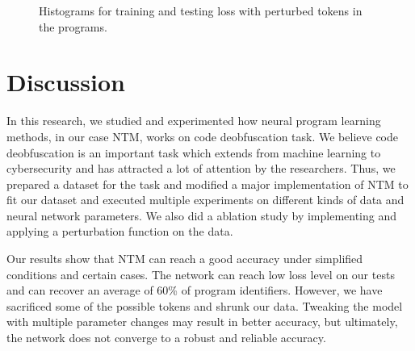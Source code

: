 \documentclass[acmsmall]{acmart}
\begin{document}
\begin{figure}
	\hspace*{\fill}

	\caption{Histograms for training and testing loss with perturbed tokens in the programs.}\label{fig:ablation}
\end{figure}

\section{Discussion}
In this research, we studied and experimented how neural program learning methods, in our case NTM, works on code deobfuscation task. We believe code deobfuscation is an important task which extends from machine learning to cybersecurity and has attracted a lot of attention by the researchers. Thus, we prepared a dataset for the task and modified a major implementation of NTM to fit our dataset and executed multiple experiments on different kinds of data and neural network parameters. We also did a ablation study by implementing and applying a perturbation function on the data.

Our results show that NTM can reach a good accuracy under simplified conditions and certain cases. The network can reach low loss level on our tests and can recover an average of 60\% of program identifiers. However, we have sacrificed some of the possible tokens and shrunk our data. Tweaking the model with multiple parameter changes may result in better accuracy, but ultimately, the network does not converge to a robust and reliable accuracy.
\end{document}
